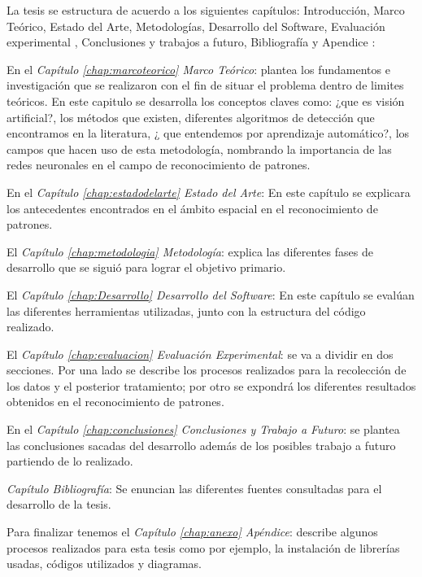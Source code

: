 La tesis se estructura de acuerdo a los siguientes capítulos: Introducción, Marco Teórico, Estado del Arte, Metodologías, Desarrollo del Software, 
Evaluación experimental , Conclusiones y trabajos a futuro, Bibliografía y Apendice :

En el \textit{Capítulo \ref{chap:marcoteorico} Marco Teórico}: plantea los fundamentos e investigación que se realizaron con el fin de situar el problema dentro de limites 
teóricos. En este capitulo se desarrolla los conceptos claves como: ¿que es visión artificial?, los métodos que existen, diferentes algoritmos de detección que encontramos en la 
literatura, ¿ que entendemos por aprendizaje automático?, los campos que hacen uso de esta metodología, nombrando la importancia de las redes neuronales en el campo de 
reconocimiento de patrones.

En el \textit{Capítulo \ref{chap:estadodelarte} Estado del Arte}: En este capítulo se explicara los antecedentes encontrados en el ámbito espacial en 
el reconocimiento de patrones.

El \textit{Capítulo \ref{chap:metodologia} Metodología}: explica las diferentes fases de desarrollo que se siguió para lograr el objetivo primario.

El \textit{Capítulo \ref{chap:Desarrollo} Desarrollo del Software}: En este capítulo se evalúan las diferentes herramientas utilizadas, junto con la 
estructura del código realizado.

El \textit{Capítulo \ref{chap:evaluacion} Evaluación Experimental}: se va a dividir en dos secciones. Por una lado se describe los procesos realizados 
para la recolección de los datos y el posterior tratamiento; por otro se expondrá los diferentes resultados obtenidos en el reconocimiento de 
patrones.

En el \textit{Capítulo \ref{chap:conclusiones} Conclusiones y Trabajo a Futuro}: se plantea las conclusiones sacadas del desarrollo además de los 
posibles trabajo a futuro partiendo de lo realizado.

\textit{Capítulo Bibliografía}: Se enuncian las diferentes fuentes consultadas para el desarrollo de la tesis.

Para finalizar tenemos el \textit{Capítulo \ref{chap:anexo} Apéndice}: describe algunos procesos realizados para esta tesis como por ejemplo, la 
instalación de librerías usadas, códigos utilizados y diagramas.
